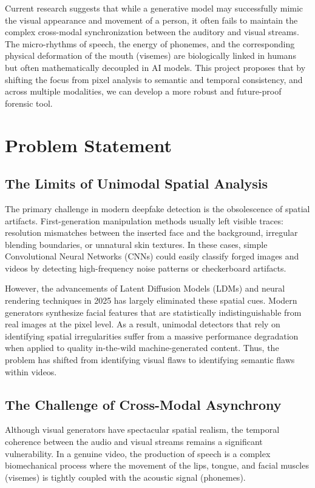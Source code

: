 \documentclass[12pt,a4paper]{report}
\begin{document}
Current research suggests that while a generative model may successfully mimic the visual appearance and movement of a person, it often fails to maintain the complex cross-modal synchronization between the auditory and visual streams. The micro-rhythms of speech, the energy of phonemes, and the corresponding physical deformation of the mouth (visemes) are biologically linked in humans but often mathematically decoupled in AI models. This project proposes that by shifting the focus from pixel analysis to semantic and temporal consistency, and across multiple modalities, we can develop a more robust and future-proof forensic tool.

\chapter{Problem Statement}\pagestyle{fancy}
\section{The Limits of Unimodal Spatial Analysis}
The primary challenge in modern deepfake detection is the obsolescence of spatial artifacts. First-generation manipulation methods usually left visible traces: resolution mismatches between the inserted face and the background, irregular blending boundaries, or unnatural skin textures. In these cases, simple Convolutional Neural Networks (CNNs) could easily classify forged images and videos by detecting high-frequency noise patterns or checkerboard artifacts.

However, the advancements of Latent Diffusion Models (LDMs) and neural rendering techniques in 2025 has largely eliminated these spatial cues. Modern generators synthesize facial features that are statistically indistinguishable from real images at the pixel level. As a result, unimodal detectors that rely on identifying spatial irregularities suffer from a massive performance degradation when applied to quality in-the-wild machine-generated content. Thus, the problem has shifted from identifying visual flaws to identifying semantic flaws within videos.

\section{The Challenge of Cross-Modal Asynchrony}
Although visual generators have spectacular spatial realism, the temporal coherence between the audio and visual streams remains a significant vulnerability. In a genuine video, the production of speech is a complex biomechanical process where the movement of the lips, tongue, and facial muscles (visemes) is tightly coupled with the acoustic signal (phonemes).
\end{document}
